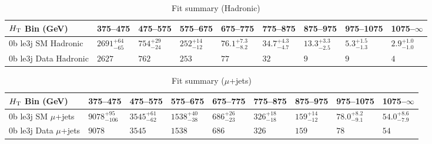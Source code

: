 \documentclass[8pt]{article}
\def\scalht{\mbox{$H_{\rm{T}}$}\xspace}
\newcommand\T{\rule{0pt}{2.6ex}}
\begin{document}
\begin{table}[ht!]
\caption{Fit summary (Hadronic)}
\label{tab:ensemble-summary}
\centering
\begin{tabular}{ lllllllll }

\hline
\scalht Bin (GeV)       & 375--475                       & 475--575                       & 575--675                       & 675--775                       & 775--875                       & 875--975                       & 975--1075                      & 1075--$\infty$                 \\ [1.000000ex]
\hline
0b le3j SM Hadronic\T   & $2691^{+64}_{-65}$             & $754^{+29}_{-24}$              & $252^{+14}_{-12}$              & $76.1^{+7.3}_{-8.2}$           & $34.7^{+4.3}_{-4.7}$           & $13.3^{+3.3}_{-2.5}$           & $5.3^{+1.5}_{-1.3}$            & $2.9^{+1.0}_{-1.0}$            \\ 
0b le3j Data Hadronic\T & $2627$                         & $762$                          & $253$                          & $77$                           & $32$                           & $9$                            & $9$                            & $4$                            \\ 
\hline

\end{tabular}
\end{table}
\begin{table}[ht!]
\caption{Fit summary ($\mu$+jets)}
\label{tab:ensemble-summary}
\centering
\begin{tabular}{ lllllllll }

\hline
\scalht Bin (GeV)       & 375--475                       & 475--575                       & 575--675                       & 675--775                       & 775--875                       & 875--975                       & 975--1075                      & 1075--$\infty$                 \\ [1.000000ex]
\hline
0b le3j SM $\mu$+jets\T & $9078^{+95}_{-106}$            & $3545^{+61}_{-62}$             & $1538^{+40}_{-38}$             & $686^{+26}_{-23}$              & $326^{+18}_{-18}$              & $159^{+14}_{-12}$              & $78.0^{+8.2}_{-9.1}$           & $54.0^{+8.6}_{-7.9}$           \\ 
0b le3j Data $\mu$+jets\T & $9078$                         & $3545$                         & $1538$                         & $686$                          & $326$                          & $159$                          & $78$                           & $54$                           \\ 
\hline

\end{tabular}
\end{table}
\end{document}
